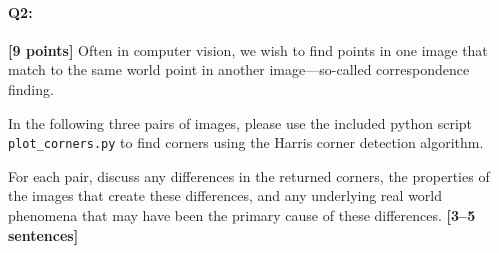 \documentclass[11pt]{article}
\begin{document}
\pagebreak


\paragraph{Q2:} \textbf{[9 points]} Often in computer vision, we wish to find points in one image that match to the same world point in another image---so-called correspondence finding.

\begin{tcolorbox}[colback=orange!5!white,colframe=orange!75!black]
In the following three pairs of images, please use the included python script \texttt{plot\_corners.py} to find corners using the Harris corner detection algorithm. 

For each pair, discuss any differences in the returned corners, the properties of the images that create these differences, and any underlying real world phenomena that may have been the primary cause of these differences. \textbf{[3--5 sentences]}
\end{tcolorbox}
\end{document}
